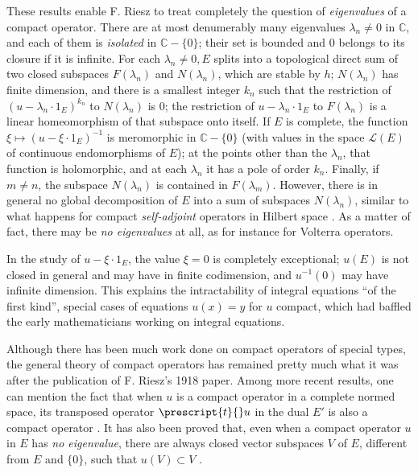 \documentclass[12pt,a4paper,leqno,twoside]{extbook}
\newcommand{\C}{\mathbb{C}}
\begin{document}
These results enable F. Riesz to treat completely the question of \emph{eigenvalues} of a compact operator. There are at most denumerably many eigenvalues \(\lambda_n \neq 0\) in \(\C\), and each of them is \emph{isolated} in \(\C - \{0\}\); their set is bounded and 0 belongs to its closure if it is infinite. For each \(\lambda_n \neq 0, E\) splits into a topological direct sum of two closed subspaces \(F(\lambda_n)\) and \(N(\lambda_n)\), which are stable by \(h\); \(N(\lambda_n)\) has finite dimension, and there is a smallest integer \(k_n\) such that the restriction of \((u - \lambda_n \cdot 1_E)^{k_n}\) to \(N(\lambda_n)\) is 0; the restriction of \(u - \lambda_n \cdot 1_E\) to \(F(\lambda_n)\) is a linear homeomorphism of that subspace onto itself. If \(E\) is complete, the function \(\xi \mapsto (u - \xi \cdot 1_E)^{-1}\) is meromorphic in \(\C-\{0\}\) (with values in the space \(\mathcal{L}(E)\) of continuous endomorphisms of \(E\)); at the points other than the \(\lambda_n\), that function is holomorphic, and at each \(\lambda_n\) it has a pole of order \(k_n\). Finally, if \(m \neq n\), the subspace \(N(\lambda_n)\) is contained in \(F(\lambda_m)\). However, there is in general no global decomposition of \(E\) into a sum of subspaces \(N(\lambda_n)\), similar to what happens for compact \emph{self-adjoint} operators in Hilbert space \cite{099}. As a matter of fact, there may be \emph{no eigenvalues} at all, as for instance for Volterra operators.

In the study of \(u - \xi \cdot 1_E\), the value \(\xi = 0\) is completely exceptional; \(u(E)\) is not closed in general and may have in finite codimension, and \(u^{-1}(0)\) may have infinite dimension. This explains the intractability of integral equations ``of the first kind'', special cases of equations \(u(x)=y\) for \(u\) compact, which had baffled the early mathematicians working on integral equations.

Although there has been much work done on compact operators of special types, the general theory of compact operators has remained pretty much what it was after the publication of F. Riesz's 1918 paper. Among more recent results, one can mention the fact that when \(u\) is a compact operator in a complete normed space, its transposed operator \(\prescript{t}{}u\) in the dual \(E'\) is also a compact operator \cite{188}. It has also been proved that, even when a compact operator \(u\) in \(E\) has \emph{no eigenvalue}, there are always closed vector subspaces \(V\) of \(E\), different from \(E\) and \(\{0\}\), such that \(u(V) \subset V\) \cite{007}.
\end{document}
